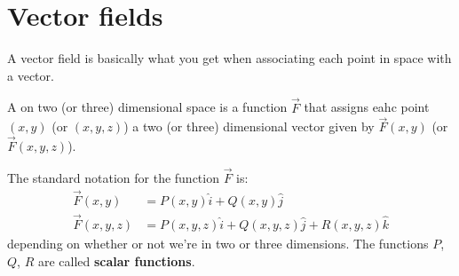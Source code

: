 \section{Vector fields}
A vector field is basically what you get when associating each point in space with a vector.

\begin{definition}
A  on two (or three) dimensional space is a function $\vec{F}$ that assigns eahc point $(x,y)$ (or $(x,y,z)$) a two (or three) dimensional vector given by $\vec{F}(x,y)$ (or $\vec{F}(x,y,z)$).
\end{definition}

The standard notation for the function $\vec{F}$ is:
\begin{align*}
\vec{F}(x,y) &= P(x,y)\hat{i} + Q(x,y)\hat{j} \\
\vec{F}(x,y,z) &= P(x,y,z)\hat{i} + Q(x,y,z)\hat{j} + R(x,y,z)\hat{k}
\end{align*}
depending on whether or not we're in two or three dimensions. The functions $P$, $Q$, $R$ are called \textbf{scalar functions}.

